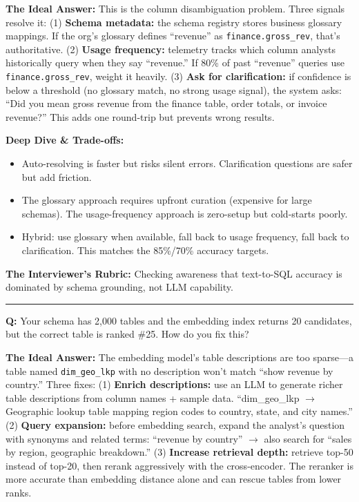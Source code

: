 \textbf{The Ideal Answer:} This is the column disambiguation problem. Three signals resolve it: (1) \textbf{Schema metadata:} the schema registry stores business glossary mappings. If the org's glossary defines ``revenue'' as \texttt{finance.gross\_rev}, that's authoritative. (2) \textbf{Usage frequency:} telemetry tracks which column analysts historically query when they say ``revenue.'' If 80\% of past ``revenue'' queries use \texttt{finance.gross\_rev}, weight it heavily. (3) \textbf{Ask for clarification:} if confidence is below a threshold (no glossary match, no strong usage signal), the system asks: ``Did you mean gross revenue from the finance table, order totals, or invoice revenue?'' This adds one round-trip but prevents wrong results.

\textbf{Deep Dive \& Trade-offs:}
\begin{itemize}
  \item Auto-resolving is faster but risks silent errors. Clarification questions are safer but add friction.
  \item The glossary approach requires upfront curation (expensive for large schemas). The usage-frequency approach is zero-setup but cold-starts poorly.
  \item Hybrid: use glossary when available, fall back to usage frequency, fall back to clarification. This matches the 85\%/70\% accuracy targets.
\end{itemize}

\textbf{The Interviewer's Rubric:} Checking awareness that text-to-SQL accuracy is dominated by schema grounding, not LLM capability.

\bigskip\hrule\bigskip

\textbf{Q:} Your schema has 2,000 tables and the embedding index returns 20 candidates, but the correct table is ranked \#25. How do you fix this?

\textbf{The Ideal Answer:} The embedding model's table descriptions are too sparse---a table named \texttt{dim\_geo\_lkp} with no description won't match ``show revenue by country.'' Three fixes: (1) \textbf{Enrich descriptions:} use an LLM to generate richer table descriptions from column names + sample data. ``dim\_geo\_lkp $\rightarrow$ Geographic lookup table mapping region codes to country, state, and city names.'' (2) \textbf{Query expansion:} before embedding search, expand the analyst's question with synonyms and related terms: ``revenue by country'' $\rightarrow$ also search for ``sales by region, geographic breakdown.'' (3) \textbf{Increase retrieval depth:} retrieve top-50 instead of top-20, then rerank aggressively with the cross-encoder. The reranker is more accurate than embedding distance alone and can rescue tables from lower ranks.

